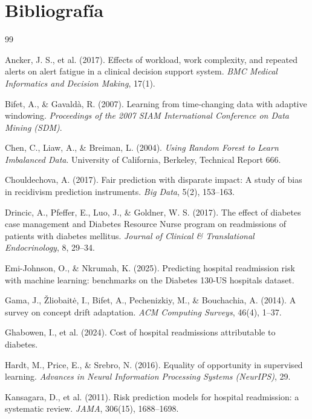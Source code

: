 \documentclass[11pt,a4paper]{article}
\begin{document}
\section*{Bibliografía}

\begin{thebibliography}{99}

 Ancker, J. S., et al. (2017). Effects of workload, work complexity, and repeated alerts on alert fatigue in a clinical decision support system. \emph{BMC Medical Informatics and Decision Making}, 17(1).

 Bifet, A., \& Gavaldà, R. (2007). Learning from time-changing data with adaptive windowing. \emph{Proceedings of the 2007 SIAM International Conference on Data Mining (SDM)}.

 Chen, C., Liaw, A., \& Breiman, L. (2004). \emph{Using Random Forest to Learn Imbalanced Data}. University of California, Berkeley, Technical Report 666.

 Chouldechova, A. (2017). Fair prediction with disparate impact: A study of bias in recidivism prediction instruments. \emph{Big Data}, 5(2), 153--163.

 Drincic, A., Pfeffer, E., Luo, J., \& Goldner, W. S. (2017). The effect of diabetes case management and Diabetes Resource Nurse program on readmissions of patients with diabetes mellitus. \emph{Journal of Clinical \& Translational Endocrinology}, 8, 29--34.

 Emi-Johnson, O., \& Nkrumah, K. (2025). Predicting hospital readmission risk with machine learning: benchmarks on the Diabetes 130-US hospitals dataset.

 Gama, J., Žliobaitė, I., Bifet, A., Pechenizkiy, M., \& Bouchachia, A. (2014). A survey on concept drift adaptation. \emph{ACM Computing Surveys}, 46(4), 1--37.

 Ghabowen, I., et al. (2024). Cost of hospital readmissions attributable to diabetes.

 Hardt, M., Price, E., \& Srebro, N. (2016). Equality of opportunity in supervised learning. \emph{Advances in Neural Information Processing Systems (NeurIPS)}, 29.

 Kansagara, D., et al. (2011). Risk prediction models for hospital readmission: a systematic review. \emph{JAMA}, 306(15), 1688--1698.


\end{thebibliography}
\end{document}
